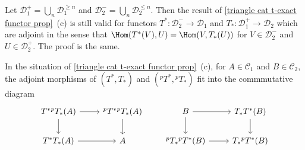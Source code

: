 \begin{remark}
Let $\mathcal{D}_1^+=\bigcup_n\mathcal{D}_1^{\geq n}$ and $\mathcal{D}_2^-=\bigcup_n\mathcal{D}_2^{\leq n}$. Then the result of \cref{triangle cat t-exact functor prop}~(c) is still valid for functors $T^*:\mathcal{D}_2^{-}\to\mathcal{D}_1$ and $T_*:\mathcal{D}_1^{+}\to\mathcal{D}_2$ which are adjoint in the sense that $\Hom(T^*(V),U)=\Hom(V,T_*(U))$ for $V\in\mathcal{D}_2^-$ and $U\in\mathcal{D}_2^+$. The proof is the same.
\end{remark}

\begin{remark}\label{triangle cat adjoint functor ^pT diagram}
In the situation of \cref{triangle cat t-exact functor prop}~(c), for $A\in\mathcal{C}_1$ and $B\in\mathcal{C}_2$, the adjoint morphisms of $(T^*,T_*)$ and $({^pT^*},{^pT_*})$ fit into the commmutative diagram
\[\begin{tikzcd}
T^*{^pT_*}(A)\ar[d]\ar[r]&{^pT^*}{^pT_*}(A)\ar[d]\\
T^*T_*(A)\ar[r]&A
\end{tikzcd}\quad\quad
\begin{tikzcd}
B\ar[r]\ar[d]&T_*T^*(B)\ar[d]\\
{^pT_*}{^pT^*}(B)\ar[r]&T_*{^pT^*}(B)
\end{tikzcd}\]
\end{remark}

